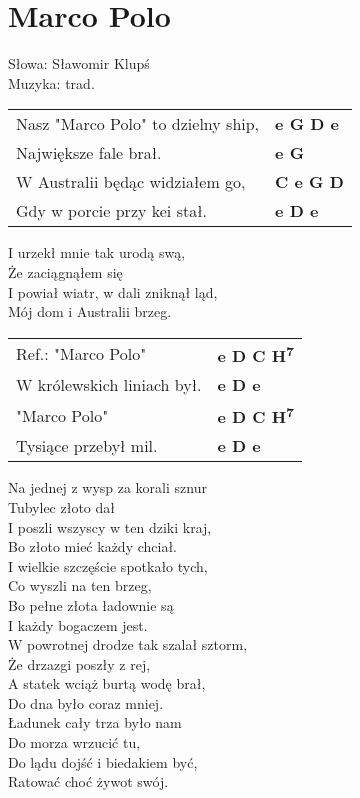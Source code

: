 \section{Marco Polo}

Słowa: Sławomir Klupś \\
Muzyka:  trad.

\vspace{2em}
\begin{tabular}{@{}p{9cm}@{}l@{}}
Nasz "Marco Polo" to dzielny ship, & \bfseries  e G D e \\
Największe fale brał. & \bfseries  e G \\
W Australii będąc widziałem go, & \bfseries C e G D \\
Gdy w porcie przy kei stał. & \bfseries  e D e \\
\end{tabular}

\vspace{1em}
I urzekł mnie tak urodą swą, \\
Że zaciągnąłem się \\
I powiał wiatr, w dali zniknął ląd, \\
Mój dom i Australii brzeg. \\

\begin{tabular}{@{}p{9cm}@{}l@{}}
Ref.: "Marco Polo"  & \bfseries  e D C H\textsuperscript{7} \\
W królewskich liniach był. & \bfseries  e D e \\
"Marco Polo"  & \bfseries  e D C H\textsuperscript{7} \\
Tysiące przebył mil. & \bfseries  e D e \\
\end{tabular}

\vspace{1em}
\begin{multicols}{2}
Na jednej z wysp za korali sznur \\
Tubylec złoto dał \\
I poszli wszyscy w ten dziki kraj, \\
Bo złoto mieć każdy chciał. \\

I wielkie szczęście spotkało tych, \\
Co wyszli na ten brzeg, \\
Bo pełne złota ładownie są \\
I każdy bogaczem jest. \\

W powrotnej drodze tak szalał sztorm, \\
Że drzazgi poszły z rej, \\
A statek wciąż burtą wodę brał, \\
Do dna było coraz mniej. \\

Ładunek cały trza było nam \\
Do morza wrzucić tu, \\
Do lądu dojść i biedakiem być, \\
Ratować choć żywot swój.
\end{multicols}